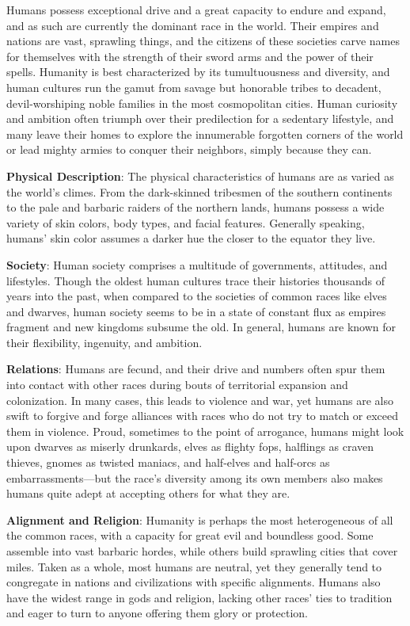 				
Humans possess exceptional drive and a great capacity to endure and expand, and as such are currently the dominant race in the world. Their empires and nations are vast, sprawling things, and the citizens of these societies carve names for themselves with the strength of their sword arms and the power of their spells. Humanity is best characterized by its tumultuousness and diversity, and human cultures run the gamut from savage but honorable tribes to decadent, devil-worshiping noble families in the most cosmopolitan cities. Human curiosity and ambition often triumph over their predilection for a sedentary lifestyle, and many leave their homes to explore the innumerable forgotten corners of the world or lead mighty armies to conquer their neighbors, simply because they can.
				
\textbf{Physical Description}: The physical characteristics of humans are as varied as the world's climes. From the dark-skinned tribesmen of the southern continents to the pale and barbaric raiders of the northern lands, humans possess a wide variety of skin colors, body types, and facial features. Generally speaking, humans' skin color assumes a darker hue the closer to the equator they live.
				
\textbf{Society}: Human society comprises a multitude of governments, attitudes, and lifestyles. Though the oldest human cultures trace their histories thousands of years into the past, when compared to the societies of common races like elves and dwarves, human society seems to be in a state of constant flux as empires fragment and new kingdoms subsume the old. In general, humans are known for their flexibility, ingenuity, and ambition.
				
\textbf{Relations}: Humans are fecund, and their drive and numbers often spur them into contact with other races during bouts of territorial expansion and colonization. In many cases, this leads to violence and war, yet humans are also swift to forgive and forge alliances with races who do not try to match or exceed them in violence. Proud, sometimes to the point of arrogance, humans might look upon dwarves as miserly drunkards, elves as flighty fops, halflings as craven thieves, gnomes as twisted maniacs, and half-elves and half-orcs as embarrassments---but the race's diversity among its own members also makes humans quite adept at accepting others for what they are. 
				
\textbf{Alignment and Religion}: Humanity is perhaps the most heterogeneous of all the common races, with a capacity for great evil and boundless good. Some assemble into vast barbaric hordes, while others build sprawling cities that cover miles. Taken as a whole, most humans are neutral, yet they generally tend to congregate in nations and civilizations with specific alignments. Humans also have the widest range in gods and religion, lacking other races' ties to tradition and eager to turn to anyone offering them glory or protection.
				
